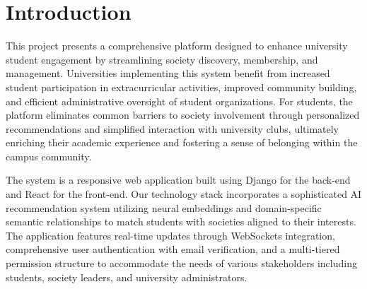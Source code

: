 \chapter{Introduction}

\noindent This project presents a comprehensive platform designed to enhance university student engagement by streamlining society discovery, membership, and management. Universities implementing this system benefit from increased student participation in extracurricular activities, improved community building, and efficient administrative oversight of student organizations. For students, the platform eliminates common barriers to society involvement through personalized recommendations and simplified interaction with university clubs, ultimately enriching their academic experience and fostering a sense of belonging within the campus community.

\noindent The system is a responsive web application built using Django for the back-end and React for the front-end. Our technology stack incorporates a sophisticated AI recommendation system utilizing neural embeddings and domain-specific semantic relationships to match students with societies aligned to their interests. The application features real-time updates through WebSockets integration, comprehensive user authentication with email verification, and a multi-tiered permission structure to accommodate the needs of various stakeholders including students, society leaders, and university administrators.